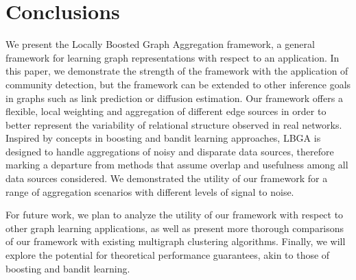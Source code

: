 \documentclass[twoside,twocolumn]{article}
\begin{document}
\section{Conclusions}
We present the Locally Boosted Graph Aggregation framework, a general framework
for learning graph representations with respect to an application. In this
paper, we demonstrate the strength of the framework with the application of
community detection, but the framework can be extended to other
inference goals in graphs such as link prediction or diffusion estimation. 
Our framework offers a flexible, local
weighting and aggregation of different edge sources in order to better represent
the variability of relational structure observed in real networks. 
Inspired by concepts in boosting and bandit learning approaches, LBGA is designed to handle aggregations of noisy and disparate 
data sources, therefore marking a departure from methods that assume overlap and usefulness among all
data sources considered. 
We demonstrated the utility of our framework for a range of aggregation scenarios with different levels 
of signal to noise. 

 For future work, we plan to analyze the utility of our framework with respect
to other graph learning applications, as well as present more thorough
comparisons of our framework with existing multigraph clustering algorithms.
Finally, we will explore the potential for theoretical performance guarantees,
akin to those of boosting and bandit learning. 



{\footnotesize }
\end{document}
